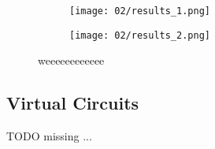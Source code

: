     \begin{figure}[H]
        \centering
        \begin{subfigure}[b]{1.0\textwidth}
            \centering 
            \texttt{[image: 02/results\_1.png]}
            \caption{}
            \label{fig:vgpijerbgvpiberq}
        \end{subfigure}
        \begin{subfigure}[b]{1.0\textwidth}
            \centering
            \texttt{[image: 02/results\_2.png]}
            \caption{}
            \label{fig:vjidqenvjqen}
        \end{subfigure}
        \caption{weeeeeeeeeeee}
        \label{fig:vneqpwijvnpjewqnpivnenq}
    \end{figure}

\subsection{Virtual Circuits}
    \colorbox{BurntOrange}{TODO missing ...}
